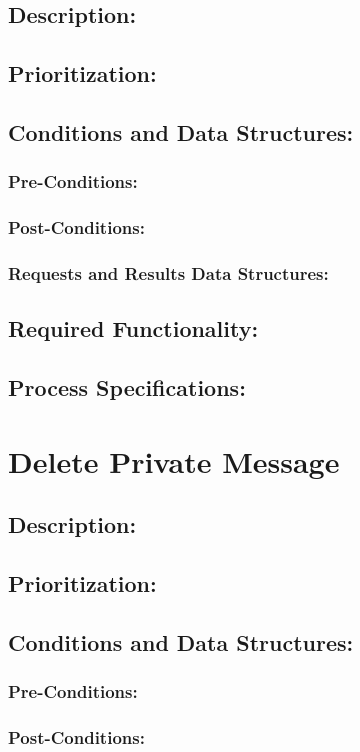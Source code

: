 \documentclass[a4paper,11pt]{article}
\begin{document}
\subsection*{Description:}
\subsection{Prioritization:} 
\subsection{Conditions and Data Structures:}
\subsubsection*{Pre-Conditions:}
\subsubsection*{Post-Conditions:}
\subsubsection*{Requests and Results Data Structures:}
\subsection{Required Functionality:} 
\subsection{Process Specifications:} 

\section{Delete Private Message}
\subsection*{Description:}
\subsection{Prioritization:} 
\subsection{Conditions and Data Structures:}
\subsubsection*{Pre-Conditions:}
\subsubsection*{Post-Conditions:}
\end{document}
